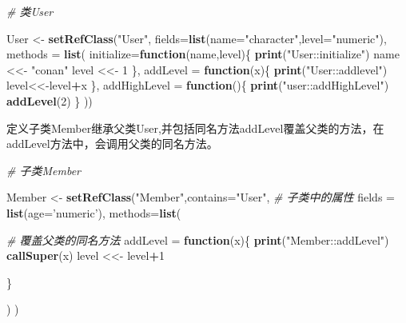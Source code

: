 \documentclass[]{book}
\newenvironment{Shaded}{\begin{snugshade}}{\end{snugshade}}
\newcommand{\KeywordTok}[1]{\textcolor[rgb]{0.13,0.29,0.53}{\textbf{#1}}}
\newcommand{\DataTypeTok}[1]{\textcolor[rgb]{0.13,0.29,0.53}{#1}}
\newcommand{\DecValTok}[1]{\textcolor[rgb]{0.00,0.00,0.81}{#1}}
\newcommand{\StringTok}[1]{\textcolor[rgb]{0.31,0.60,0.02}{#1}}
\newcommand{\CommentTok}[1]{\textcolor[rgb]{0.56,0.35,0.01}{\textit{#1}}}
\newcommand{\ControlFlowTok}[1]{\textcolor[rgb]{0.13,0.29,0.53}{\textbf{#1}}}
\newcommand{\OperatorTok}[1]{\textcolor[rgb]{0.81,0.36,0.00}{\textbf{#1}}}
\newcommand{\NormalTok}[1]{#1}
\begin{document}
\begin{Shaded}
\begin{Highlighting}[]
\CommentTok{# 类User}

\NormalTok{User <-}\StringTok{ }\KeywordTok{setRefClass}\NormalTok{(}\StringTok{"User"}\NormalTok{,}
                    \DataTypeTok{fields=}\KeywordTok{list}\NormalTok{(}\DataTypeTok{name=}\StringTok{"character"}\NormalTok{,}\DataTypeTok{level=}\StringTok{"numeric"}\NormalTok{),}
                    \DataTypeTok{methods =} \KeywordTok{list}\NormalTok{(}
                      \DataTypeTok{initialize=}\ControlFlowTok{function}\NormalTok{(name,level)\{}
                        \KeywordTok{print}\NormalTok{(}\StringTok{"User::initialize"}\NormalTok{)}
\NormalTok{                        name <<-}\StringTok{ "conan"}
\NormalTok{                        level <<-}\StringTok{ }\DecValTok{1}
\NormalTok{                      \},}
                      \DataTypeTok{addLevel =} \ControlFlowTok{function}\NormalTok{(x)\{}
                        \KeywordTok{print}\NormalTok{(}\StringTok{"User::addlevel"}\NormalTok{)}
\NormalTok{                        level<<-level}\OperatorTok{+}\NormalTok{x}
\NormalTok{                      \},}
                      \DataTypeTok{addHighLevel =} \ControlFlowTok{function}\NormalTok{()\{}
                        \KeywordTok{print}\NormalTok{(}\StringTok{"user::addHighLevel"}\NormalTok{)}
                        \KeywordTok{addLevel}\NormalTok{(}\DecValTok{2}\NormalTok{)}
\NormalTok{                      \}}
\NormalTok{                    ))}
\end{Highlighting}
\end{Shaded}

定义子类Member继承父类User,并包括同名方法addLevel覆盖父类的方法，在addLevel方法中，会调用父类的同名方法。

\begin{Shaded}
\begin{Highlighting}[]
\CommentTok{# 子类Member}

\NormalTok{Member <-}\StringTok{ }\KeywordTok{setRefClass}\NormalTok{(}\StringTok{"Member"}\NormalTok{,}\DataTypeTok{contains=}\StringTok{"User"}\NormalTok{,}
                      \CommentTok{# 子类中的属性}
                      \DataTypeTok{fields =} \KeywordTok{list}\NormalTok{(}\DataTypeTok{age=}\StringTok{'numeric'}\NormalTok{),}
                      \DataTypeTok{methods=}\KeywordTok{list}\NormalTok{(}
                        
                        \CommentTok{# 覆盖父类的同名方法}
                        \DataTypeTok{addLevel =} \ControlFlowTok{function}\NormalTok{(x)\{}
                          \KeywordTok{print}\NormalTok{(}\StringTok{"Member::addLevel"}\NormalTok{)}
                                                  \KeywordTok{callSuper}\NormalTok{(x)}
\NormalTok{                        level <<-}\StringTok{ }\NormalTok{level}\OperatorTok{+}\DecValTok{1}
                        
\NormalTok{                        \}}

\NormalTok{                      )}
\NormalTok{                      )}
\end{Highlighting}
\end{Shaded}
\end{document}
